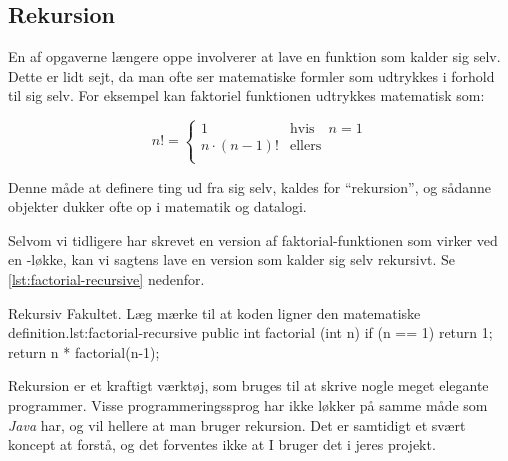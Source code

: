 	\subsection{Rekursion}

        En af opgaverne længere  oppe
        involverer at lave en funktion som kalder sig selv. Dette er
        lidt sejt, da man ofte ser matematiske formler som udtrykkes i
        forhold til sig selv. For eksempel kan faktoriel funktionen
        udtrykkes matematisk som:

        \begin{equation}
            n! = \begin{cases}
                       1 & \text{hvis} \quad n = 1 \\
                       n\cdot(n-1)! & \text{ellers} \\
                  \end{cases}
        \end{equation}

        Denne måde at definere ting ud fra sig selv, kaldes for
        ``rekursion'', og sådanne objekter dukker ofte op i matematik
        og datalogi.


        Selvom vi tidligere har skrevet en version af
        faktorial-funktionen som virker ved en -løkke,
        kan vi sagtens lave en version som kalder sig selv rekursivt.
        Se \autoref{lst:factorial-recursive} nedenfor.

        \begin{JavaCode}{Rekursiv Fakultet. Læg mærke til at koden ligner den matematiske definition.}{lst:factorial-recursive}
            public int factorial (int n) {
                if (n == 1)   return 1;
                return n * factorial(n-1);
            }
        \end{JavaCode}

        Rekursion er et kraftigt værktøj, som bruges til at skrive
        nogle meget elegante programmer. Visse programmeringssprog har
        ikke løkker på samme måde som \emph{Java} har, og vil hellere
        at man bruger rekursion.  Det er samtidigt et svært koncept at
        forstå, og det forventes ikke at I bruger det i jeres projekt.

